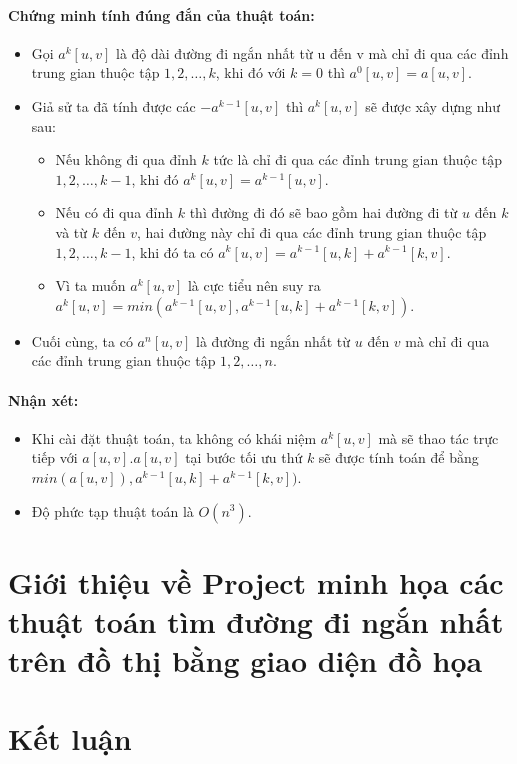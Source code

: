 \documentclass[a4paper,12pt]{report}
\begin{document}
    \subsubsection{Chứng minh tính đúng đắn của thuật toán:}
\begin{itemize}
	\item Gọi $ a^{k}[u, v] $ là độ dài đường đi ngắn nhất từ u đến v mà chỉ đi qua các đỉnh trung gian thuộc tập $ {1, 2, \ldots, k} $, khi đó với $ k = 0 $ thì $ a^{0}[u, v] = a[u, v] $.
	\item Giả sử ta đã tính được các $ - a^{k-1}[u, v] $ thì $ a^{k}[u, v] $ sẽ được xây dựng như sau:
	\begin{itemize}
	\item Nếu không đi qua đỉnh $k$ tức là chỉ đi qua các đỉnh trung gian thuộc tập $ {1, 2, \ldots, k-1} $, khi đó $ a^{k}[u, v] = a^{k-1}[u, v]  $.
	\item Nếu có đi qua đỉnh $k$ thì đường đi đó sẽ bao gồm hai đường đi từ $u$ đến $k$ và từ $k$ đến $v$, hai đường này chỉ đi qua các đỉnh trung gian thuộc tập $ {1, 2, \ldots, k-1} $, khi đó ta có $ a^{k}[u, v] = a^{k-1}[u, k] + a^{k-1}[k, v] $.
	\item Vì ta muốn $ a^{k}[u, v] $ là cực tiểu nên suy ra $ a^{k}[u, v] = min(a^{k-1}[u, v], a^{k-1}[u, k] + a^{k-1}[k, v]) $.
	\end{itemize} 
	\item Cuối cùng, ta có $ a^{n}[u, v] $ là đường đi ngắn nhất từ $u$ đến $v$ mà chỉ đi qua các đỉnh trung gian thuộc tập $ {1, 2, \ldots, n} $.

\end{itemize}

    \subsubsection{Nhận xét:}
\begin{itemize}
 \item Khi cài đặt thuật toán, ta không có khái niệm $ a^{k}[u, v] $ mà sẽ thao tác trực tiếp với $ a[u, v] $.$ a[u, v] $ tại bước tối ưu thứ $k$ sẽ được tính toán để bằng $ min(a[u, v]), a^{k-1}[u, k] + a^{k-1}[k, v]) $.
 \item Độ phức tạp thuật toán là $ O(n^{3}) $.

\end{itemize}

\chapter{Giới thiệu về Project minh họa các thuật toán tìm đường đi ngắn nhất trên đồ thị bằng giao diện đồ họa}


\chapter{Kết luận}

				
\end{document}
